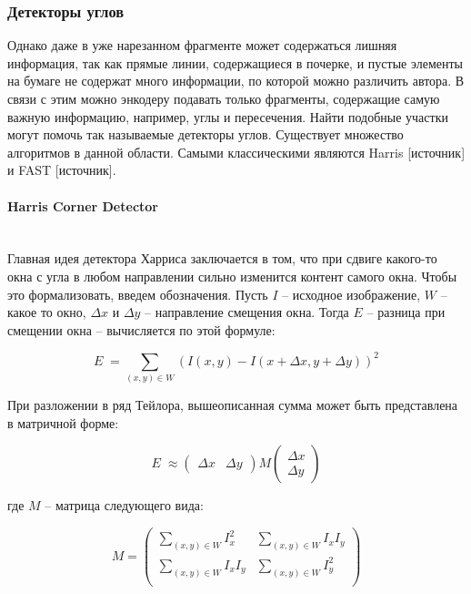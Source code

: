 \subsubsection{Детекторы углов}

    Однако даже в уже нарезанном фрагменте может содержаться лишняя информация, так как прямые линии, содержащиеся в почерке, и пустые элементы на бумаге не содержат много информации, по которой можно различить автора. В связи с этим можно энкодеру подавать только фрагменты, содержащие самую важную информацию, например, углы и пересечения. Найти подобные участки могут помочь так называемые детекторы углов. Существует множество алгоритмов в данной области. Самыми классическими являются Harris [источник] и FAST [источник].

    \paragraph{Harris Corner Detector}\mbox{} \\
    Главная идея детектора Харриса заключается в том, что при сдвиге какого-то окна с угла в любом направлении сильно изменится контент самого окна. Чтобы это формализовать, введем обозначения. Пусть $I$ -- исходное изображение, $W$ -- какое то окно, $\Delta x$ и $\Delta y$ -- направление смещения окна. Тогда $E$ -- разница при смещении окна -- вычисляется по этой формуле:

    $$
    E \; = \sum_{(x, y) \in W} \left( I(x, y) - I(x + \Delta x, y + \Delta y)\right)^2
    $$
    \smallskip
    \noindent

    При разложении в ряд Тейлора, вышеописанная сумма может быть представлена в матричной форме:

    $$
    E \; \approx \begin{pmatrix}
        \Delta x & \Delta y
        \end{pmatrix} 
        M\begin{pmatrix}
        \Delta x\\
        \Delta y
        \end{pmatrix}
    $$

    \smallskip
    \noindent
    где $M$ -- матрица следующего вида:

    $$
    M = \begin{pmatrix}
        \sum_{(x, y) \in W} I^2_x & \sum_{(x, y) \in W} I_x I_y \\
        \sum_{(x, y) \in W} I_x I_y & \sum_{(x, y) \in W} I^2_y \\
    \end{pmatrix}
    $$

